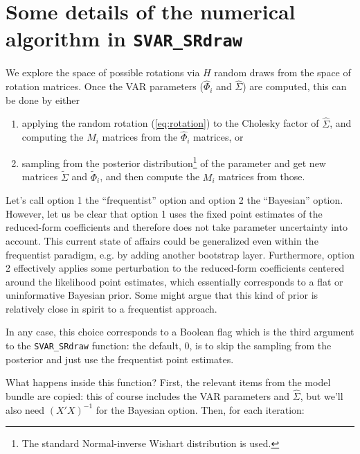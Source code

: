 \documentclass[a4paper,10pt]{article}
\begin{document}

\clearpage

\section{Some details of the numerical algorithm in \texttt{SVAR\_SRdraw}}
\label{sec:SRdraw_details}

We explore the space of possible rotations via $H$ random draws from the space
of rotation matrices.  Once the VAR parameters ($\hat{\Phi}_i$ and
$\hat{\Sigma}$) are computed, this can be done by either
\begin{enumerate}
\item applying the random rotation (\ref{eq:rotation}) to the Cholesky factor of
  $\hat{\Sigma}$, and computing the $M_i$ matrices from the $\hat{\Phi}_i$
  matrices, or
\item sampling from the posterior distribution\footnote{The standard
    Normal-inverse Wishart distribution is used.} of the parameter and get new
  matrices $\tilde{\Sigma}$ and $\tilde{\Phi}_i$, and then compute the $M_i$
  matrices from those.
\end{enumerate}
Let's call option 1 the ``frequentist'' option and option 2 the ``Bayesian''
option. However, let us be clear that option 1 uses the fixed point estimates of
the reduced-form coefficients and therefore does not take parameter uncertainty
into account. This current state of affairs could be generalized even within the
frequentist paradigm, e.g. by adding another bootstrap layer. Furthermore,
option 2 effectively applies some perturbation to the reduced-form coefficients
centered around the likelihood point estimates, which essentially corresponds to
a flat or uninformative Bayesian prior. Some might argue that this kind of prior
is relatively close in spirit to a frequentist approach.

In any case, this choice corresponds to a Boolean flag which is the third
argument to the \texttt{SVAR\_SRdraw} function: the default, 0, is to skip the
sampling from the posterior and just use the frequentist point estimates.

What happens inside this function? First, the relevant items from the model
bundle are copied: this of course includes the VAR parameters and
$\hat{\Sigma}$, but we'll also need $(X'X)^{-1}$ for the Bayesian option.  Then,
for each iteration:
\end{document}
